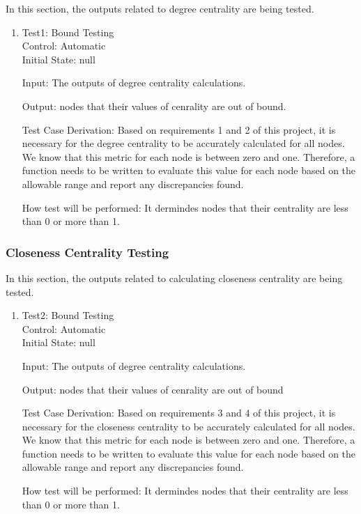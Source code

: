 \documentclass[12pt, titlepage]{article}
\begin{document}
In this section, the outputs related to degree centrality are being tested.
\begin{enumerate}

\item{Test1: Bound Testing\\}	
Control: Automatic\\				
Initial State: null
					
Input:  The outputs of degree centrality calculations.
					
Output: nodes that their values of cenrality are out of bound.

Test Case Derivation: Based on requirements 1 and 2 of this project, it is necessary for the degree centrality to be accurately calculated for all nodes. We know that this metric for each node is between zero and one. Therefore, a function needs to be written to evaluate this value for each node based on the allowable range and report any discrepancies found.






How test will be performed: It dermindes nodes that their centrality are less than 0 or more than 1.


\end{enumerate}
\subsubsection{Closeness Centrality Testing}

In this section, the outputs related to calculating closeness centrality are being tested.

\begin{enumerate}

\item{Test2: Bound Testing\\}	
Control: Automatic	\\			
Initial State: null
					
Input:  The outputs of degree centrality calculations.
					
Output: nodes that their values of cenrality are out of bound

Test Case Derivation: Based on requirements 3 and 4 of this project, it is necessary for the closeness centrality to be accurately calculated for all nodes. We know that this metric for each node is between zero and one. Therefore, a function needs to be written to evaluate this value for each node based on the allowable range and report any discrepancies found.

How test will be performed: It dermindes nodes that their centrality are less than 0 or more than 1.




\end{enumerate}
\end{document}
